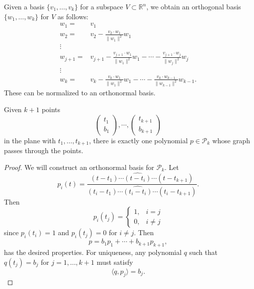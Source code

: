 \documentclass[12pt]{article}
\begin{document}
\begin{theorem}
	Given a basis $\{v_1,\dots,v_k\}$ for a subspace $V\subset\mathbb{R}^n$, we obtain an orthogonal basis $\{w_1,\dots,w_k\}$ for $V$ as follows: 
	\begin{align*}
		w_1 =& v_1 \\ 
		w_2 =& v_2 - \frac{v_2\cdot w_1}{\|w_1\|^2}w_1 \\
		\vdots& \\
		w_{j+1} =& v_{j+1} - \frac{v_{j+1}\cdot w_1}{\|w_1\|^2}w_1 - \cdots - \frac{v_{j+1}\cdot w_j}{\|w_j\|^2}w_j \\
		\vdots& \\
		w_k =& v_k - \frac{v_k\cdot w_1}{\|w_1\|^2}w_1 - \cdots - \frac{v_k\cdot w_{k-1}}{\|w_{k-1}\|^2}w_{k-1}.
	\end{align*}
	These can be normalized to an orthonormal basis.
\end{theorem}

\begin{theorem}
	Given $k+1$ points 
	\begin{equation*}
		\begin{pmatrix} t_1 \\ b_1 \end{pmatrix}, \cdots, \begin{pmatrix} t_{k+1} \\ b_{k+1} \end{pmatrix}
	\end{equation*}
	in the plane with $t_1,\dots, t_{k+1}$, there is exactly one polynomial $p\in \mathcal{P}_k$ whose graph passes through the points.
\end{theorem}
\begin{proof} 
	We will construct an orthonormal basis for $\mathcal{P}_k$. Let 
	\begin{equation*}
		p_i(t) = \frac{(t-t_1)\cdots\widehat{(t-t_i)}\cdots (t-t_{k+1})}{(t_i-t_1)\cdots\widehat{(t_i-t_i)}\cdots (t_i-t_{k+1})}.
	\end{equation*}
	Then 
	\begin{equation*}
		p_i(t_j) = \begin{cases} 1, & i=j \\ 0, & i\neq j \end{cases}
	\end{equation*}
	since $p_i(t_i)=1$ and $p_i(t_j)=0$ for $i\neq j$. Then 
	\begin{equation*}
		p = b_1p_1 + \cdots + b_{k+1}p_{k+1},
	\end{equation*}
	has the desired properties. For uniqueness, any polynomial $q$ such that $q(t_j)=b_j$ for $j=1,\dots,k+1$ must satisfy 
	\begin{equation*}
		\langle q,p_j \rangle = b_j.
	\end{equation*}
\end{proof}	
\end{document}
